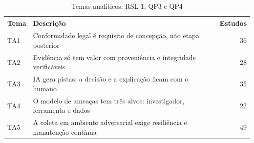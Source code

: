 \begin{table}[htbp]
\centering
\caption{Temas analíticos: RSL 1, QP3 e QP4}
\label{tab:temas-A2}
\small
\begin{tabular}{lp{11cm}r}
\hline
\textbf{Tema} & \textbf{Descrição} & \textbf{Estudos} \\
\hline
TA1 & Conformidade legal é requisito de concepção, não etapa posterior & 36 \\
TA2 & Evidência só tem valor com proveniência e integridade verificáveis & 28 \\
TA3 & IA gera pistas; a decisão e a explicação ficam com o humano & 35 \\
TA4 & O modelo de ameaças tem três alvos: investigador, ferramenta e dados & 22 \\
TA5 & A coleta em ambiente adversarial exige resiliência e manutenção contínua & 49 \\
\hline
\end{tabular}
\end{table}
